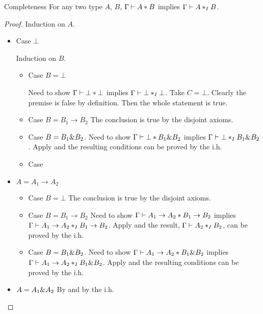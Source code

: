 \begin{theorem}{Completeness}
  For any two type $A$, $B$, $\Gamma \vdash A * B$ implies $\Gamma \vdash A *_I B$.
\end{theorem}

\begin{proof}
  Induction on $A$.

  \begin{itemize}
    \item Case $\bot$

    Induction on $B$.
      \begin{itemize}
        \item Case $B = \bot$

          Need to show $\Gamma \vdash \bot * \bot$ implies $\Gamma \vdash \bot *_I \bot$. Take $C = \bot$. Clearly the premise is false by definition. Then the whole statement is true. 

        \item Case $B = B_1 \to B_2$
        The conclusion is true by the disjoint axioms.

        \item Case $B = B_1 \& B_2$.
        Need to show $\Gamma \vdash \bot * B_1 \& B_2$ implies $\Gamma \vdash \bot *_I B_1 \& B_2$. Apply  and the resulting conditions can be proved by the i.h.

        \item Case
      \end{itemize}

      \item $A = A_1 \to A_2$
        \begin{itemize}
          \item Case $B = \bot$
          The conclusion is true by the disjoint axioms.

          \item Case $B = B_1 \to B_2$
          Need to show $\Gamma \vdash  A_1 \to A_2 * B_1 \to B_2$ implies $\Gamma \vdash  A_1 \to A_2 *_I B_1 \to B_2$. Apply  and the result, $\Gamma \vdash A_2 *_I B_2$, can be proved by the i.h.

          \item Case $B = B_1 \& B_2$.
          Need to show $\Gamma \vdash A_1 \to A_2 * B_1 \& B_2$ implies $\Gamma \vdash A_1 \to A_2 *_I B_1 \& B_2$. Apply  and the resulting conditions can be proved by the i.h.
        \end{itemize}

        \item $A = A_1 \& A_2$
        By  and by the i.h.

      \end{itemize}
\end{proof}
